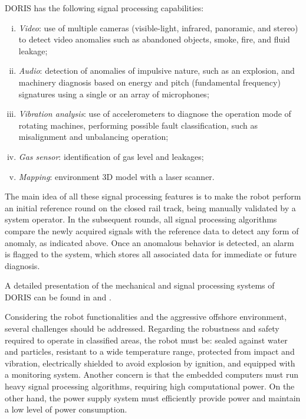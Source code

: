 \documentclass{ifacconf}
\begin{document}
DORIS has the following signal processing capabilities:
\begin{enumerate}[i)]
\item \emph{Video}: use of multiple cameras (visible-light, infrared, panoramic,
and stereo) to detect video anomalies such as abandoned objects, smoke, fire, and fluid leakage;
\item \emph{Audio}: detection of anomalies of impulsive nature, such as an
explosion, and machinery diagnosis based on energy and pitch (fundamental
frequency) signatures using a single or an array of microphones;
\item \emph{Vibration analysis}: use of accelerometers to
diagnose the operation mode of rotating machines, performing possible fault
classification, such as misalignment and unbalancing operation;
\item \emph{Gas sensor}: identification of gas level and leakages;
\item \emph{Mapping}: environment 3D model with a laser scanner.
\end{enumerate}

The main idea of all these signal processing features is to make the robot
perform an initial reference round on the closed rail track, being manually
validated by a system operator. In the subsequent rounds, all signal processing
algorithms compare the newly acquired signals with the reference data to detect
any form of anomaly, as indicated above. Once an anomalous behavior is
detected, an alarm is flagged to the system, which stores all associated data
for immediate or future diagnosis.

A detailed presentation of the mechanical and signal
processing systems of DORIS can be found in \cite{OTC} and \cite{cba}.

Considering the robot functionalities and the aggressive offshore environment,
several challenges should be addressed. Regarding the robustness and safety
required to operate in classified areas, the robot must be: sealed against water
and particles, resistant to a wide temperature range, protected from impact and
vibration, electrically shielded to avoid explosion by ignition, and equipped
with a monitoring system. Another concern is that the embedded computers must
run heavy signal processing algorithms, requiring high computational power. On
the other hand, the power supply system must efficiently provide power and
maintain a low level of power consumption. 
\end{document}
